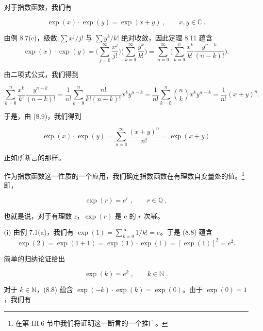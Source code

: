\begin{example}

\begin{items}
\item

对于指数函数，我们有

\begin{equation}
\exp(x)\cdot\exp(y)=\exp(x+y)~,\qquad x,y\in\mathbb{C}~.
\end{equation}

\proofhead
由例 8.7(c)，级数 $ \sum x^j / j! $ 与 $ \sum y^k / k! $ 绝对收敛，因此定理 8.11 蕴含
\begin{equation}
\exp(x)\cdot\exp(y)=\Big(\sum_{j=0}^{\infty}\frac{x^{j}}{j!}\Big)\Big(\sum_{k=0}^{\infty}\frac{y^{k}}{k!}\Big)=\sum_{n=0}^{\infty}\Big(\sum_{k=0}^{n}\frac{x^{k}}{k!}\frac{y^{n-k}}{(n-k)!}\Big).
\end{equation}

由二项式公式，我们得到

\[
\sum_{k=0}^{n}\frac{x^{k}}{k!}\frac{y^{n-k}}{(n-k)!}=\frac{1}{n!}\sum_{k=0}^{n}\frac{n!}{k!(n-k)!}x^{k}y^{n-k}=\frac{1}{n!}\sum_{k=0}^{n}\binom{n}{k}x^{k}y^{n-k}=\frac{1}{n!}(x+y)^{n}.
\]

于是，由 (8.9)，我们得到

\[
\exp(x)\cdot\exp(y)=\sum_{n=0}^{\infty}\frac{(x+y)^{n}}{n!}=\exp(x+y)
\]

正如所断言的那样。

\item

作为指数函数这一性质的一个应用，我们确定指数函数在有理数自变量处的值。\footnote{在第 III.6 节中我们将证明这一断言的一个推广。}即，

\[
\exp(r)=e^{r}\;,\qquad r\in\mathbb{Q}\;,
\]

也就是说，对于有理数 r，$ \exp(r) $ 是 e 的 $ r $ 次幂。

\begin{subitems}
\item

\proofhead
(i) 由例 7.1(a)，我们有 $ \exp(1) = \sum_{k=0}^{\infty} 1/k! = e $。于是 (8.8) 蕴含
\[
\exp(2)=\exp(1+1)=\exp(1)\cdot\exp(1)=\left[\exp(1)\right]^{2}=e^{2}.
\]

简单的归纳论证给出

\[
\exp(k)=e^{k}\;,\qquad k\in\mathbb{N}\;.
\]
\item

对于 $ k \in \mathbb{N} $，(8.8) 蕴含 $ \exp(-k) \cdot \exp(k) = \exp(0) $。由于 $ \exp(0) = 1 $，我们有


\end{subitems}
\end{items}
\end{example}
